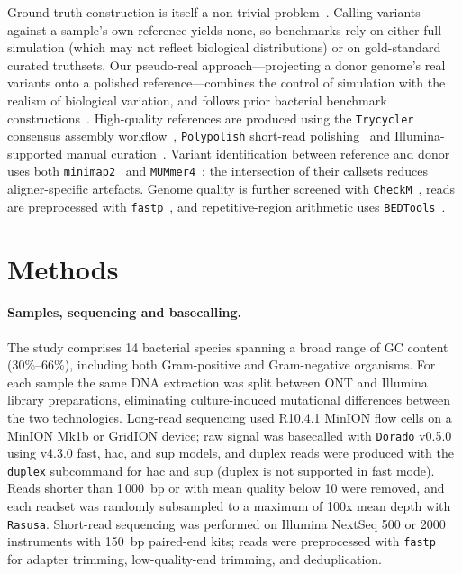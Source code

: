 \documentclass[11pt]{article}
\begin{document}
Ground-truth construction is itself a non-trivial problem~\citep{olson2022giab}. Calling variants against a sample's own reference yields none, so benchmarks rely on either full simulation (which may not reflect biological distributions) or on gold-standard curated truthsets. Our pseudo-real approach---projecting a donor genome's real variants onto a polished reference---combines the control of simulation with the realism of biological variation, and follows prior bacterial benchmark constructions~\citep{bush2020genomic}. High-quality references are produced using the \texttt{Trycycler} consensus assembly workflow~\citep{wick2021trycycler}, \texttt{Polypolish} short-read polishing~\citep{wick2022polypolish} and Illumina-supported manual curation~\citep{wick2023perfect}. Variant identification between reference and donor uses both \texttt{minimap2}~\citep{li2018minimap2} and \texttt{MUMmer4}~\citep{marcais2018mummer4}; the intersection of their callsets reduces aligner-specific artefacts. Genome quality is further screened with \texttt{CheckM}~\citep{parks2015checkm}, reads are preprocessed with \texttt{fastp}~\citep{chen2018fastp}, and repetitive-region arithmetic uses \texttt{BEDTools}~\citep{quinlan2010bedtools}.

\section{Methods}

\paragraph{Samples, sequencing and basecalling.}
The study comprises 14 bacterial species spanning a broad range of GC content (30\%--66\%), including both Gram-positive and Gram-negative organisms. For each sample the same DNA extraction was split between ONT and Illumina library preparations, eliminating culture-induced mutational differences between the two technologies. Long-read sequencing used R10.4.1 MinION flow cells on a MinION Mk1b or GridION device; raw signal was basecalled with \texttt{Dorado} v0.5.0 using v4.3.0 fast, hac, and sup models, and duplex reads were produced with the \texttt{duplex} subcommand for hac and sup (duplex is not supported in fast mode). Reads shorter than 1\,000~bp or with mean quality below 10 were removed, and each readset was randomly subsampled to a maximum of 100x mean depth with \texttt{Rasusa}. Short-read sequencing was performed on Illumina NextSeq 500 or 2000 instruments with 150~bp paired-end kits; reads were preprocessed with \texttt{fastp}~\citep{chen2018fastp} for adapter trimming, low-quality-end trimming, and deduplication.
\end{document}

